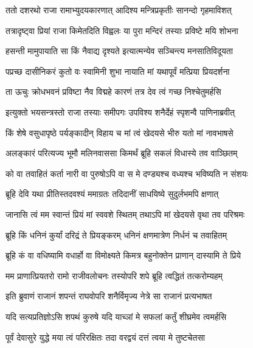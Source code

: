



\twolineshloka
{ततो दशरथो राजा रामाभ्युदयकारणात्}
{आदिश्य मन्त्रिप्रकृतीः सानन्दो गृहमाविशत्} %

\twolineshloka
{तत्रादृष्ट्वा प्रियां राजा किमेतदिति विह्वलः}
{या पुरा मन्दिरं तस्याः प्रविष्टे मयि शोभना} %

\twolineshloka
{हसन्ती मामुपायाति सा किं नैवाद्य दृश्यते}
{इत्यात्मन्येव सञ्चिन्त्य मनसातिविदूयता} %

\twolineshloka
{पप्रच्छ दासीनिकरं कुतो वः स्वामिनी शुभा}
{नायाति मां यथापूर्वं मत्प्रिया प्रियदर्शना} %

\twolineshloka
{ता ऊचुः क्रोधभवनं प्रविष्टा नैव विद्महे}
{कारणं तत्र देव त्वं गच्छ निश्चेतुमर्हसि} %

\twolineshloka
{इत्युक्तो भयसन्त्रस्तो राजा तस्याः समीपगः}
{उपविश्य शनैर्देहं स्पृशन्वै पाणिनाब्रवीत्} %

\twolineshloka
{किं शेषे वसुधापृष्ठे पर्यङ्कादीन् विहाय च}
{मां त्वं खेदयसे भीरु यतो मां नावभाषसे} %

\twolineshloka
{अलङ्कारं परित्यज्य भूमौ मलिनवाससा}
{किमर्थं ब्रूहि सकलं विधास्ये तव वाञ्छितम्} %

\twolineshloka
{को वा तवाहितं कर्ता नारी वा पुरुषोऽपि वा}
{स मे दण्ड्यश्च वध्यश्च भविष्यति न संशयः} %

\twolineshloka
{ब्रूहि देवि यथा प्रीतिस्तदवश्यं ममाग्रतः}
{तदिदानीं साधयिष्ये सुदुर्लभमपि क्षणात्} %

\twolineshloka
{जानासि त्वं मम स्वान्तं प्रियं मां स्ववशे स्थितम्}
{तथाऽपि मां खेदयसे वृथा तव परिश्रमः} %

\twolineshloka
{ब्रूहि किं धनिनं कुर्यां दरिद्रं ते प्रियङ्करम्}
{धनिनं क्षणमात्रेण निर्धनं च तवाहितम्} %

\twolineshloka
{ब्रूहि कं वा वधिष्यामि वधार्हो वा विमोक्ष्यते}
{किमत्र बहुनोक्तेन प्राणान् दास्यामि ते प्रिये} %

\twolineshloka
{मम प्राणात्प्रियतरो रामो राजीवलोचनः}
{तस्योपरि शपे ब्रूहि त्वद्धितं तत्करोम्यहम्} %

\twolineshloka
{इति ब्रुवाणं राजानं शपन्तं राघवोपरि}
{शनैर्विमृज्य नेत्रे सा राजानं प्रत्यभाषत} %

\twolineshloka
{यदि सत्यप्रतिज्ञोऽसि शपथं कुरुषे यदि}
{याच्ञां मे सफलां कर्तुं शीघ्रमेव त्वमर्हसि} %

\twolineshloka
{पूर्वं देवासुरे युद्धे मया त्वं परिरक्षितः}
{तदा वरद्वयं दत्तं त्वया मे तुष्टचेतसा} %

